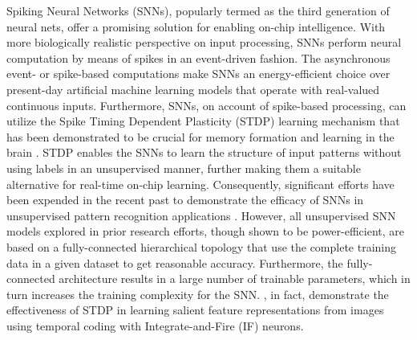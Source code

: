 \documentclass[journal, onecolumn]{IEEEtran}
\begin{document}
Spiking Neural Networks (SNNs), popularly termed as the third generation of neural nets, offer a promising solution for enabling on-chip intelligence. With more biologically realistic perspective on input processing, SNNs perform neural computation by means of spikes in an event-driven fashion. The asynchronous event- or spike-based computations make SNNs an energy-efficient choice over present-day artificial machine learning models that operate with real-valued continuous inputs. Furthermore, SNNs, on account of spike-based processing, can utilize the Spike Timing Dependent Plasticity (STDP) learning mechanism that has been demonstrated to be crucial for memory formation and learning in the brain \cite{masquelier2009competitive, dan2004spike}. STDP enables the SNNs to learn the structure of input patterns without using labels in an unsupervised manner, further making them a suitable alternative for real-time on-chip learning. Consequently, significant efforts have been expended in the recent past to demonstrate the efficacy of SNNs in unsupervised pattern recognition applications \cite{diehl2015unsupervised, querlioz2011simulation, kasabov2013dynamic, masquelier2007unsupervised, kheradpisheh2016stdp, kheradpisheh2016bio}. However, all unsupervised SNN models explored in prior research efforts, though shown to be power-efficient, are based on a fully-connected hierarchical topology \cite{diehl2015unsupervised, querlioz2011simulation} that use the complete training data in a given dataset to get reasonable accuracy. Furthermore, the fully-connected architecture results in a large number of trainable parameters, which in turn increases the training complexity for the SNN. \cite{masquelier2007unsupervised, kheradpisheh2016stdp, kheradpisheh2016bio}, in fact, demonstrate the effectiveness of STDP in learning salient feature representations from images using temporal coding with Integrate-and-Fire (IF) neurons.
\end{document}
